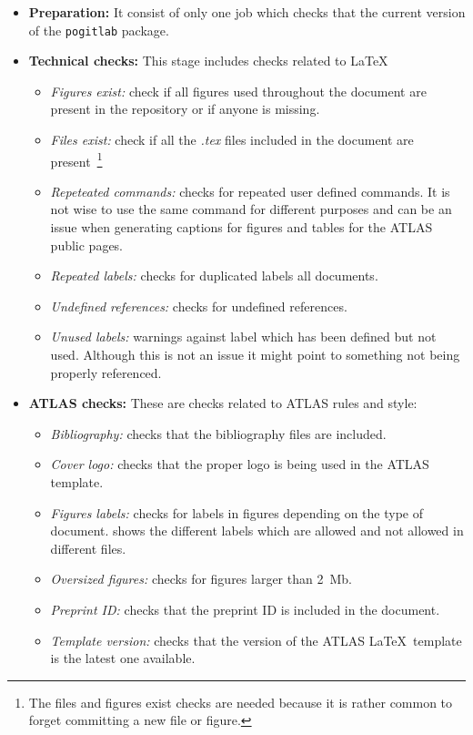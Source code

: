 \begin{itemize}
  \item \textbf{Preparation:} It consist of only one job which checks that the current version of the \texttt{pogitlab} package.
  \item \textbf{Technical checks:} This stage includes checks related to \LaTeX\:
  \begin{itemize}
    \item \textit{Figures exist:} check if all figures used throughout the document are present in the repository or if anyone is missing.
    \item \textit{Files exist:} check if all the \textit{.tex} files included in the document are present~\footnote{The files and figures exist checks are needed because it is rather common to forget committing a new file or figure.}
    \item \textit{Repeteated commands:} checks for repeated user defined commands. It is not wise to use the same command for different purposes and can be an issue when generating captions for figures and tables for the ATLAS public pages.
    \item \textit{Repeated labels:} checks for duplicated labels all documents.
    \item \textit{Undefined references:} checks for undefined references.
    \item \textit{Unused labels:} warnings against label which has been defined but not used. Although this is not an issue it might point to something not being properly referenced.
  \end{itemize}
  \item \textbf{ATLAS checks:} These are checks related to ATLAS rules and style:
  \begin{itemize}
    \item \textit{Bibliography:} checks that the bibliography files are included.
    \item \textit{Cover logo:} checks that the proper logo is being used in the ATLAS template.
    \item \textit{Figures labels:} checks for labels in figures depending on the type of document. \Tab{\ref{tab:labels-files}} shows the different labels which are allowed and not allowed in different files.
    \item \textit{Oversized figures:} checks for figures larger than 2~Mb.
    \item \textit{Preprint ID:} checks that the preprint ID is included in the document.
    \item \textit{Template version:} checks that the version of the ATLAS \LaTeX\ template is the latest one available.

\end{itemize}
\end{itemize}
